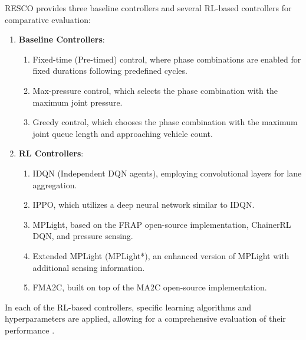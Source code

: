 RESCO provides three baseline controllers and several RL-based controllers for comparative evaluation:

\begin{enumerate}
    \item \textbf{Baseline Controllers}:
    \begin{enumerate}
        \item Fixed-time (Pre-timed) control, where phase combinations are enabled for fixed durations following predefined cycles.
        \item Max-pressure control, which selects the phase combination with the maximum joint pressure. \cite{chen2020toward}
        \item Greedy control, which chooses the phase combination with the maximum joint queue length and approaching vehicle count.\cite{ma2020feudal}
    \end{enumerate}
    
    \item \textbf{RL Controllers}:
    \begin{enumerate}
        \item IDQN (Independent DQN agents), employing convolutional layers for lane aggregation\cite{ault2020learning}.
        \item IPPO, which utilizes a deep neural network similar to IDQN\cite{ault2020learning}.
        \item MPLight, based on the FRAP open-source implementation, ChainerRL DQN, and pressure sensing\cite{zheng2019learning}.
        \item Extended MPLight (MPLight*), an enhanced version of MPLight with additional sensing information.
        \item FMA2C, built on top of the MA2C open-source implementation\cite{chu2019multi}.
    \end{enumerate}
\end{enumerate}

In each of the RL-based controllers, specific learning algorithms and hyperparameters are applied, allowing for a comprehensive evaluation of their performance \cite{ault2020learning, chen2020toward, chu2019multi, ma2020feudal, zheng2019learning}.



